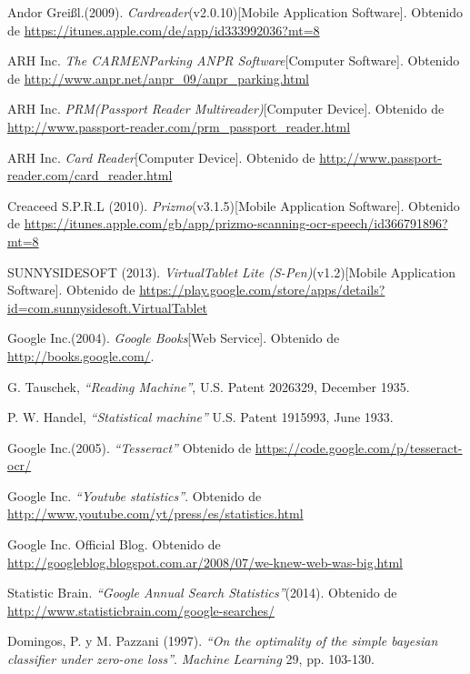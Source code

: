 \begin{thebibliography}{100}
		Andor Grei{\ss}l.(2009).
		\emph{Cardreader}(v2.0.10)[Mobile Application Software].
		Obtenido de \url{https://itunes.apple.com/de/app/id333992036?mt=8}
		
		ARH Inc.
		\emph{The CARMEN\textregistered Parking ANPR Software}[Computer Software].
		Obtenido de \url{http://www.anpr.net/anpr_09/anpr_parking.html}
		
		ARH Inc.
		\emph{PRM(Passport Reader Multireader)}[Computer Device].
		Obtenido de \url{http://www.passport-reader.com/prm_passport_reader.html}
		
		ARH Inc.
		\emph{Card Reader}[Computer Device].
		Obtenido de \url{http://www.passport-reader.com/card_reader.html}
	
		Creaceed S.P.R.L (2010).
		\emph{Prizmo}(v3.1.5)[Mobile Application Software].
		Obtenido de \url{https://itunes.apple.com/gb/app/prizmo-scanning-ocr-speech/id366791896?mt=8}
		
		SUNNYSIDESOFT (2013).
		\emph{VirtualTablet Lite (S-Pen)}(v1.2)[Mobile Application Software].
		Obtenido de \url{https://play.google.com/store/apps/details?id=com.sunnysidesoft.VirtualTablet}
		
		Google Inc.(2004).
		\emph{Google Books}[Web Service].
		Obtenido de \url{http://books.google.com/}.
		
		G. Tauschek,
		\emph{``Reading Machine''},
		U.S. Patent 2026329,
		December 1935.
		
		P. W. Handel,
		\emph{``Statistical machine''}
		U.S. Patent 1915993,
		June 1933.
	
		Google Inc.(2005).
		\emph{``Tesseract''}
		Obtenido de \url{https://code.google.com/p/tesseract-ocr/}
		
	Google Inc.
	\emph{``Youtube statistics''}.
	Obtenido de \url{http://www.youtube.com/yt/press/es/statistics.html}
	
	Google Inc. 
	Official Blog.
	Obtenido de \url{http://googleblog.blogspot.com.ar/2008/07/we-knew-web-was-big.html}
	
	Statistic Brain.
	\emph{``Google Annual Search Statistics''}(2014).
	Obtenido de \url{http://www.statisticbrain.com/google-searches/}
	
		Domingos, P. y M. Pazzani (1997).
		\emph{``On the optimality of the simple bayesian classifier under zero-one loss''}. \textit{Machine Learning} 29, pp. 103-130.
		

\end{thebibliography}
